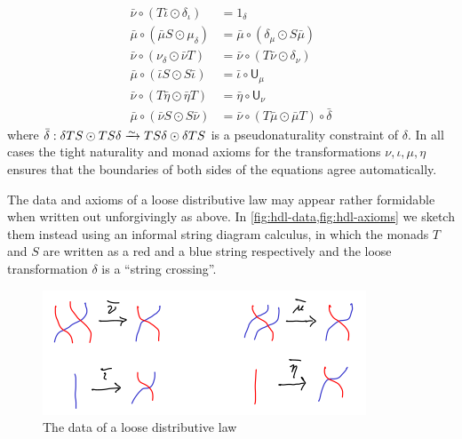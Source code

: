 \documentclass{amsart}
\newcommand{\hunit}[1]{\mathsf{U}_{#1}}
\newcommand{\Tmult}{\nu}
\newcommand{\Tunit}{\iota}
\newcommand{\Smult}{\mu}
\newcommand{\Sunit}{\eta}
\newcommand{\dl}{\delta}
\newcommand{\dlnat}{\bar\delta}
\newcommand{\Tdlmult}{\bar\Tmult}%
\newcommand{\Sdlmult}{\bar\Smult}%
\newcommand{\Tdlunit}{\bar\Tunit}%
\newcommand{\Sdlunit}{\bar\Sunit}%
\begin{document}
\begin{defn}
\begin{enumerate}
\begin{align*}
        \Tdlmult \circ (T\Tdlunit \odot \dl_{\Tunit}) &= 1_\dl \\  %
        \Sdlmult \circ (\Sdlmult S\odot \Smult_\dl) &= \Sdlmult \circ (\dl_{\Smult} \odot S \Sdlmult) \\ %
        \Tdlmult \circ (\Tmult_\dl\odot \Tdlmult T) &= \Tdlmult \circ (T \Tdlmult\odot \dl_{\Tmult}) \\ %
        \Sdlmult \circ (\Tdlunit S\odot S\Tdlunit) &= \Tdlunit \circ \hunit{\Smult} \\ %
        \Tdlmult \circ (T\Sdlunit\odot \Sdlunit T) &= \Sdlunit \circ \hunit{\Tmult} \\ %
        \Sdlmult \circ (\Tdlmult S\odot S\Tdlmult) &= \Tdlmult \circ (T\Sdlmult\odot \Sdlmult T) \circ \dlnat %
      \end{align*}
      where $\dlnat : \dl TS \odot TS \dl \toiso TS \dl \odot \dl TS$ is a pseudonaturality constraint of $\dl$.
      In all cases the tight naturality and monad axioms for the transformations $\Tmult,\Tunit,\Smult,\Sunit$ ensures that the boundaries of both sides of the equations agree automatically.
  \end{enumerate}
\end{defn}

The data and axioms of a loose distributive law may appear rather formidable when written out unforgivingly as above.
In \cref{fig:hdl-data,fig:hdl-axioms} we sketch them instead using an informal string diagram calculus, in which the monads $T$ and $S$ are written as a red and a blue string respectively and the loose transformation $\dl$ is a ``string crossing''.

\begin{figure}
  \centering
  \includegraphics{hdl-data.png}
  \caption{The data of a loose distributive law}
  \label{fig:hdl-data}
\end{figure}
\end{document}
